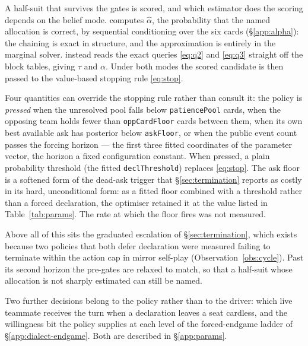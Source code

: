 A half-suit that survives the gates is scored, and which estimator does the
scoring depends on the belief mode. \vfast{} computes $\hat\alpha$, the
probability that the named allocation is correct, by sequential conditioning
over the six cards (\S\ref{app:alpha}): the chaining is exact in structure,
and the approximation is entirely in the marginal solver. \vblock{} instead
reads the exact queries \eqref{eq:q2} and \eqref{eq:q3} straight off the block
tables, giving $\tau$ and $\alpha$. Under both modes the scored candidate is
then passed to the value-based stopping rule \eqref{eq:stop}.

Four quantities can override the stopping rule rather than consult it: the
policy is \emph{pressed} when the unresolved pool falls below
\texttt{patiencePool} cards, when the opposing team holds fewer than
\texttt{oppCardFloor} cards between them, when its own best available ask has
posterior below \texttt{askFloor}, or when the public event count passes the
forcing horizon --- the first three fitted coordinates of the parameter
vector, the horizon a fixed configuration constant. When pressed, a plain
probability threshold (the fitted \texttt{declThreshold}) replaces
\eqref{eq:stop}. The ask floor is a softened form of the dead-ask trigger that
\S\ref{sec:termination} reports as costly in its hard, unconditional form: as
a fitted floor combined with a threshold rather than a forced declaration, the
optimiser retained it at the value listed in Table~\ref{tab:params}. The rate
at which the floor fires was not measured.

Above all of this sits the graduated escalation of \S\ref{sec:termination},
which exists because two policies that both defer declaration were measured
failing to terminate within the action cap in mirror self-play
(Observation~\ref{obs:cycle}). Past its second horizon the pre-gates are
relaxed to match, so that a half-suit whose allocation is not sharply
estimated can still be named.

Two further decisions belong to the policy rather than to the driver: which
live teammate receives the turn when a declaration leaves a seat cardless, and
the willingness bit the policy supplies at each level of the forced-endgame
ladder of \S\ref{app:dialect-endgame}. Both are described in
\S\ref{app:params}.
